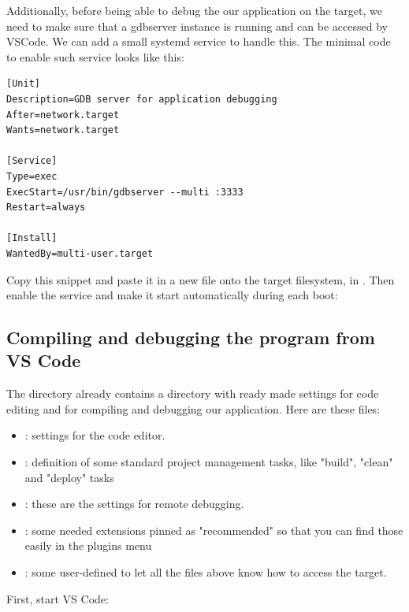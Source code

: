 Additionally, before being able to debug the our application on the target, we
need to make sure that a gdbserver instance is running and can be accessed
by VSCode. We can add a small systemd service to handle this. The minimal
code to enable such service looks like this:
\begin{verbatim}
[Unit]
Description=GDB server for application debugging
After=network.target
Wants=network.target

[Service]
Type=exec
ExecStart=/usr/bin/gdbserver --multi :3333
Restart=always

[Install]
WantedBy=multi-user.target
\end{verbatim}
Copy this snippet and paste it in a new  file onto
the target filesystem, in . Then enable the
service and make it start automatically during each boot:


\subsection{Compiling and debugging the program from VS Code}

The  directory already contains a  directory
with ready made settings for code editing and for compiling and debugging
our application. Here are these files:

\begin{itemize}
	\item {}: settings for the code editor.
	\item {}: definition of some standard project
		management tasks, like "build", "clean" and "deploy" tasks
	\item {}: these are the settings for remote
		debugging.
	\item {}: some needed extensions pinned as
		"recommended" so that you can find those easily in the plugins
		menu
	\item {}: some user-defined to let all the files above know how
		to access the target.
\end{itemize}

First, start VS Code:



